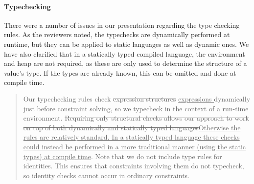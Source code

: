 \documentclass[10pt,twocolumn]{article}
\providecommand{\DIFaddtex}[1]{{\protect\color{BLUE}\uline{#1}}} %
\providecommand{\DIFdeltex}[1]{{\protect\color{gray}\sout{#1}}}                      %
\providecommand{\DIFaddbegin}{} %
\providecommand{\DIFaddend}{} %
\providecommand{\DIFdelbegin}{} %
\providecommand{\DIFdelend}{} %
\providecommand{\DIFadd}[1]{\texorpdfstring{\DIFaddtex{#1}}{#1}} %
\providecommand{\DIFdel}[1]{\texorpdfstring{\DIFdeltex{#1}}{}} %
\begin{document}

\paragraph{Typechecking}
There were a number of issues in our presentation regarding the type
checking rules. As the reviewers noted, the typechecks are dynamically
performed at runtime, but they can be applied to static languages as
well as dynamic ones. We have also clarified that in a statically
typed compiled language, the environment and heap are not required, as
these are only used to determine the structure of a value's type. If
the types are already known, this can be omitted and done at compile
time.
\begin{quote}
  Our typechecking rules check \DIFdelbegin \DIFdel{expression
    structures }\DIFdelend \DIFaddbegin \DIFadd{expressions
  }\DIFaddend dynamically just before constraint solving, so we
  typecheck in the context of a run-time environment.  \DIFdelbegin
  \DIFdel{Requiring only structural checks allows our approach to work
    on top of both dynamically and statically typed
    languages}\DIFdelend \DIFaddbegin \DIFadd{Otherwise the rules are
    relatively standard.  In a statically typed language these checks
    could instead be performed in a more traditional manner (using the
    static types) at compile time}\DIFaddend .  Note that we do not
  include type rules for identities. This ensures that constraints
  involving them do not typecheck, so identity checks cannot occur in
  ordinary constraints.
\end{quote}


\end{document}
